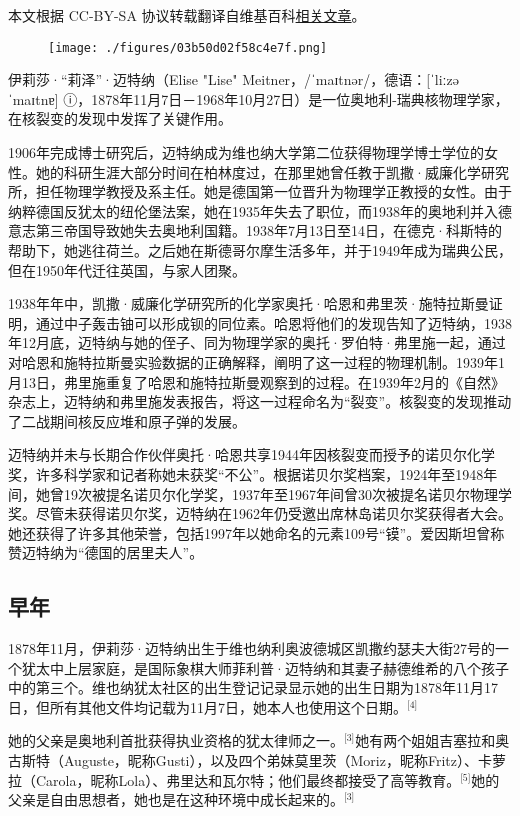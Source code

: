 
本文根据 CC-BY-SA 协议转载翻译自维基百科\href{https://en.wikipedia.org/wiki/Lise_Meitner}{相关文章}。

\begin{figure}[ht]
\centering
\texttt{[image: ./figures/03b50d02f58c4e7f.png]}
\caption{} \label{fig_LZm_1}
\end{figure}
伊莉莎·“莉泽”·迈特纳（Elise "Lise" Meitner，/ˈmaɪtnər/，德语：[ˈliːzə ˈmaɪtnɐ] ⓘ，1878年11月7日－1968年10月27日）是一位奥地利-瑞典核物理学家，在核裂变的发现中发挥了关键作用。

1906年完成博士研究后，迈特纳成为维也纳大学第二位获得物理学博士学位的女性。她的科研生涯大部分时间在柏林度过，在那里她曾任教于凯撒·威廉化学研究所，担任物理学教授及系主任。她是德国第一位晋升为物理学正教授的女性。由于纳粹德国反犹太的纽伦堡法案，她在1935年失去了职位，而1938年的奥地利并入德意志第三帝国导致她失去奥地利国籍。1938年7月13日至14日，在德克·科斯特的帮助下，她逃往荷兰。之后她在斯德哥尔摩生活多年，并于1949年成为瑞典公民，但在1950年代迁往英国，与家人团聚。

1938年年中，凯撒·威廉化学研究所的化学家奥托·哈恩和弗里茨·施特拉斯曼证明，通过中子轰击铀可以形成钡的同位素。哈恩将他们的发现告知了迈特纳，1938年12月底，迈特纳与她的侄子、同为物理学家的奥托·罗伯特·弗里施一起，通过对哈恩和施特拉斯曼实验数据的正确解释，阐明了这一过程的物理机制。1939年1月13日，弗里施重复了哈恩和施特拉斯曼观察到的过程。在1939年2月的《自然》杂志上，迈特纳和弗里施发表报告，将这一过程命名为“裂变”。核裂变的发现推动了二战期间核反应堆和原子弹的发展。

迈特纳并未与长期合作伙伴奥托·哈恩共享1944年因核裂变而授予的诺贝尔化学奖，许多科学家和记者称她未获奖“不公”。根据诺贝尔奖档案，1924年至1948年间，她曾19次被提名诺贝尔化学奖，1937年至1967年间曾30次被提名诺贝尔物理学奖。尽管未获得诺贝尔奖，迈特纳在1962年仍受邀出席林岛诺贝尔奖获得者大会。她还获得了许多其他荣誉，包括1997年以她命名的元素109号“镆”。爱因斯坦曾称赞迈特纳为“德国的居里夫人”。
\subsection{早年}
1878年11月，伊莉莎·迈特纳出生于维也纳利奥波德城区凯撒约瑟夫大街27号的一个犹太中上层家庭，是国际象棋大师菲利普·迈特纳和其妻子赫德维希的八个孩子中的第三个。维也纳犹太社区的出生登记记录显示她的出生日期为1878年11月17日，但所有其他文件均记载为11月7日，她本人也使用这个日期。\(^\text{[4]}\)

她的父亲是奥地利首批获得执业资格的犹太律师之一。\(^\text{[3]}\)她有两个姐姐吉塞拉和奥古斯特（Auguste，昵称Gusti），以及四个弟妹莫里茨（Moriz，昵称Fritz）、卡萝拉（Carola，昵称Lola）、弗里达和瓦尔特；他们最终都接受了高等教育。\(^\text{[5]}\)她的父亲是自由思想者，她也是在这种环境中成长起来的。\(^\text{[3]}\)


